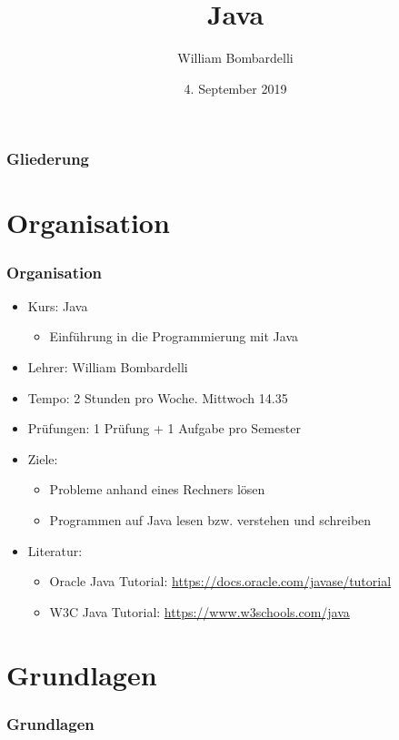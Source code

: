 \documentclass{beamer}
\title[Java]{Java}
\author[W. Bombardelli]{William Bombardelli}
\institute[Schweizerschule Mexiko]
{
	\vskip 12pt
	Schweizerschule Mexiko, Ciudad de México, Mexiko \\
	\texttt{\url{https://github.com/wbombardellis/java-unterricht}}
}
\date{4. September 2019}
\begin{document}
	\begin{frame}
		\titlepage
	\end{frame}
	
	\begin{frame}
		\frametitle{Gliederung}
		\tableofcontents
	\end{frame}
	
	\section{Organisation}
	\begin{frame}
		\frametitle{Organisation}
		
		\begin{itemize}
			\item Kurs: Java
			\begin{itemize}
				\item Einführung in die Programmierung mit Java
			\end{itemize}
			\item Lehrer: William Bombardelli
			\item Tempo: 2 Stunden pro Woche. Mittwoch 14.35
			\item Prüfungen: 1 Prüfung + 1 Aufgabe pro Semester
			\item Ziele:
			\begin{itemize}
				\item Probleme anhand eines Rechners lösen
				\item Programmen auf Java lesen bzw. verstehen und schreiben 
			\end{itemize}
			\item Literatur: 
			\begin{itemize}
				\item Oracle Java Tutorial: \url{https://docs.oracle.com/javase/tutorial}
				\item W3C Java Tutorial: \url{https://www.w3schools.com/java}
			\end{itemize}
		\end{itemize}
	\end{frame}

	\section{Grundlagen}
	\begin{frame}
		\frametitle{Grundlagen}
	\end{frame}
\end{document}
